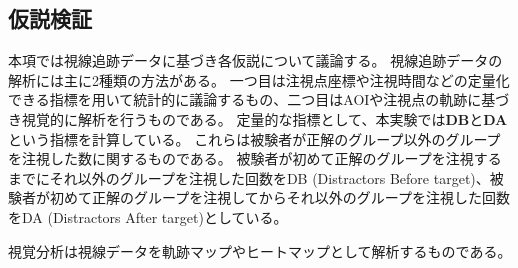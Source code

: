 \documentclass{kuee}
\begin{document}
\subsection{仮説検証}
\label{subsec:eyetrack_result_ex1}
本項では視線追跡データに基づき各仮説について議論する。
視線追跡データの解析には主に2種類の方法がある。
一つ目は注視点座標や注視時間などの定量化できる指標を用いて統計的に議論するもの、二つ目はAOIや注視点の軌跡に基づき視覚的に解析を行うものである。
定量的な指標として、本実験では{\bf DB}と{\bf DA}という指標を計算している。
これらは被験者が正解のグループ以外のグループを注視した数に関するものである。
被験者が初めて正解のグループを注視するまでにそれ以外のグループを注視した回数をDB (Distractors Before target)、被験者が初めて正解のグループを注視してからそれ以外のグループを注視した回数をDA (Distractors After target)としている。

視覚分析は視線データを軌跡マップやヒートマップとして解析するものである。




\begin{acknowledgements}

\end{acknowledgements}








\appendix
\end{document}
